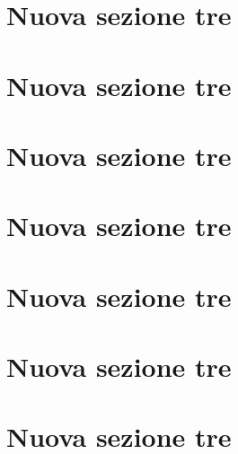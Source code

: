 

\section{Nuova sezione tre}
\hfill\break

\section{Nuova sezione tre}
\hfill\break

\section{Nuova sezione tre}
\hfill\break

\section{Nuova sezione tre}
\hfill\break

\section{Nuova sezione tre}
\hfill\break

\section{Nuova sezione tre}
\hfill\break
\hfill\break

\section{Nuova sezione tre}
\hfill\break
\hfill\break


